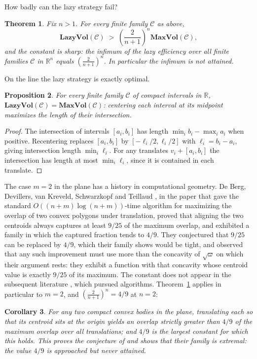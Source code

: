 \documentclass[12pt]{article}
\newtheorem{theorem}{Theorem}
\newtheorem{proposition}[theorem]{Proposition}
\newtheorem{corollary}[theorem]{Corollary}
\theoremstyle{definition}
\newcommand{\R}{\mathbb{R}}
\newcommand{\MV}{\mathbf{MaxVol}}
\newcommand{\LV}{\mathbf{LazyVol}}
\begin{document}
How badly can the lazy strategy fail?

\begin{theorem}\label{thm:main}
Fix $n>1$.  For every finite family $\mathcal{C}$ as above,
\[
\LV(\mathcal{C}) \;>\; \left(\frac{2}{n+1}\right)^{n} \MV(\mathcal{C}),
\]
and the constant is sharp: the infimum of the lazy efficiency over all
finite families $\mathcal{C}$ in $\R^n$ equals
$\left(\tfrac{2}{n+1}\right)^n$.  In particular the infimum is not
attained.
\end{theorem}

On the line the lazy strategy is exactly optimal.

\begin{proposition}\label{prop:dimone}
For every finite family $\mathcal{C}$ of compact intervals in $\R$,
$\LV(\mathcal{C})=\MV(\mathcal{C})$: centering each interval at its
midpoint maximizes the length of their intersection.
\end{proposition}

\begin{proof}
The intersection of intervals $[a_i,b_i]$ has length
$\min_i b_i-\max_i a_i$ when positive.  Recentering replaces $[a_i,b_i]$ by
$[-\ell_i/2,\ell_i/2]$ with $\ell_i=b_i-a_i$, giving intersection length
$\min_i\ell_i$.  For any translates $v_i+[a_i,b_i]$ the intersection has
length at most $\min_i\ell_i$, since it is contained in each translate.
\end{proof}

The case $m=2$ in the plane has a history in computational geometry.
De Berg, Devillers, van Kreveld, Schwarzkopf and Teillaud \cite{deberg},
in the paper that gave the standard $O((n+m)\log(n+m))$-time algorithm for
maximizing the overlap of two convex polygons under translation, proved
that aligning the two centroids always captures at least $9/25$ of the
maximum overlap, and exhibited a family in which the captured fraction
tends to $4/9$.  They conjectured that $9/25$ can be replaced by $4/9$,
which their family shows would be tight, and observed that any such
improvement must use more than the concavity of $\sqrt{\omega}$ on which
their argument rests: they exhibit a function with that concavity whose
centroid value is exactly $9/25$ of its maximum.  The constant does not
appear in the subsequent literature
\cite{ahnbrassshin,ahnrigid,ahncr,harpeledroy,chanhair}, which pursued
algorithms.  Theorem~\ref{thm:main} applies in particular to $m=2$, and
$\left(\tfrac{2}{n+1}\right)^n = 4/9$ at $n=2$:

\begin{corollary}\label{cor:twobody}
For any two compact convex bodies in the plane, translating each so that
its centroid sits at the origin yields an overlap strictly greater than
$4/9$ of the maximum overlap over all translations; and $4/9$ is the
largest constant for which this holds.  This proves the conjecture of
\cite{deberg} and shows that their family is extremal: the value $4/9$ is
approached but never attained.
\end{corollary}
\end{document}

